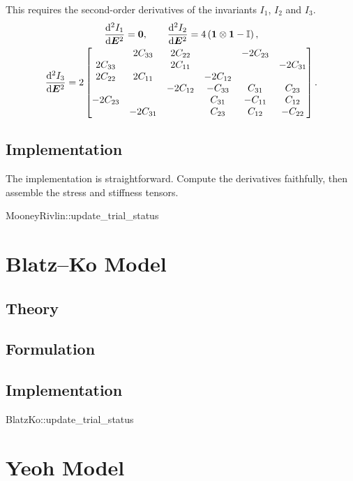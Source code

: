 This requires the second-order derivatives of the invariants $I_1$, $I_2$ and $I_3$.
\begin{gather}
\dfrac{\mathrm{d}^2I_1}{\mathrm{d}\bm{E}^2}=\bm{0},\qquad
\dfrac{\mathrm{d}^2I_2}{\mathrm{d}\bm{E}^2}=4\left(\bm{1}\otimes\bm{1}-\mathbb{I}\right),\\
\begin{split}
\dfrac{\mathrm{d}^2I_3}{\mathrm{d}\bm{E}^2}=2\begin{bmatrix}
             & 2C_{33}  & 2C_{22}  &          & -2C_{23} &          \\
    2C_{33}  &          & 2C_{11}  &          &          & -2C_{31} \\
    2C_{22}  & 2C_{11}  &          & -2C_{12} &          &          \\
             &          & -2C_{12} & -C_{33}  & C_{31}   & C_{23}   \\
    -2C_{23} &          &          & C_{31}   & -C_{11}  & C_{12}   \\
             & -2C_{31} &          & C_{23}   & C_{12}   & -C_{22}
\end{bmatrix}.
\end{split}
\end{gather}
\subsection{Implementation}
The implementation is straightforward.
Compute the derivatives faithfully, then assemble the stress and stiffness tensors.
\begin{cppcode}
MooneyRivlin::update_trial_status
\end{cppcode}
\section{Blatz--Ko Model}
\subsection{Theory}
\subsection{Formulation}
\subsection{Implementation}
\begin{cppcode}
BlatzKo::update_trial_status
\end{cppcode}
\section{Yeoh Model}
